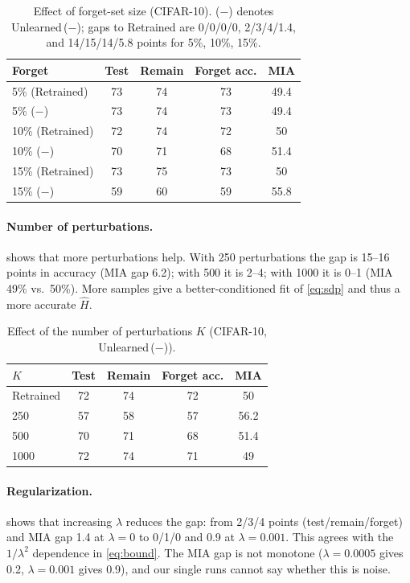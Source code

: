 \documentclass[10pt,twocolumn,letterpaper]{article}
\begin{document}
\begin{table}[t]
  \centering
  \small
  \begin{tabular}{@{}lcccc@{}}
    \toprule
    Forget & Test & Remain & Forget acc. & MIA \\
    \midrule
    5\% (Retrained) & 73 & 74 & 73 & 49.4 \\
    5\% ($-$) & 73 & 74 & 73 & 49.4 \\
    \midrule
    10\% (Retrained) & 72 & 74 & 72 & 50 \\
    10\% ($-$) & 70 & 71 & 68 & 51.4 \\
    \midrule
    15\% (Retrained) & 73 & 75 & 73 & 50 \\
    15\% ($-$) & 59 & 60 & 59 & 55.8 \\
    \bottomrule
  \end{tabular}
  \caption{Effect of forget-set size (CIFAR-10). ($-$) denotes Unlearned\,($-$); gaps to Retrained are 0/0/0/0, 2/3/4/1.4, and 14/15/14/5.8 points for 5\%, 10\%, 15\%.}
  \label{tab:forget}
\end{table}

\paragraph{Number of perturbations.}  shows that more perturbations help. With 250 perturbations the gap is 15--16 points in accuracy (MIA gap 6.2); with 500 it is 2--4; with 1000 it is 0--1 (MIA 49\% vs.\ 50\%). More samples give a better-conditioned fit of \cref{eq:sdp} and thus a more accurate $\hat H$.

\begin{table}[t]
  \centering
  \small
  \begin{tabular}{@{}lcccc@{}}
    \toprule
    $K$ & Test & Remain & Forget acc. & MIA \\
    \midrule
    Retrained & 72 & 74 & 72 & 50 \\
    250 & 57 & 58 & 57 & 56.2 \\
    500 & 70 & 71 & 68 & 51.4 \\
    1000 & 72 & 74 & 71 & 49 \\
    \bottomrule
  \end{tabular}
  \caption{Effect of the number of perturbations $K$ (CIFAR-10, Unlearned\,($-$)).}
  \label{tab:pert}
\end{table}

\paragraph{Regularization.}  shows that increasing $\lambda$ reduces the gap: from 2/3/4 points (test/remain/forget) and MIA gap 1.4 at $\lambda=0$ to 0/1/0 and 0.9 at $\lambda=0.001$. This agrees with the $1/\lambda^2$ dependence in \cref{eq:bound}. The MIA gap is not monotone ($\lambda=0.0005$ gives 0.2, $\lambda=0.001$ gives 0.9), and our single runs cannot say whether this is noise.
\end{document}
